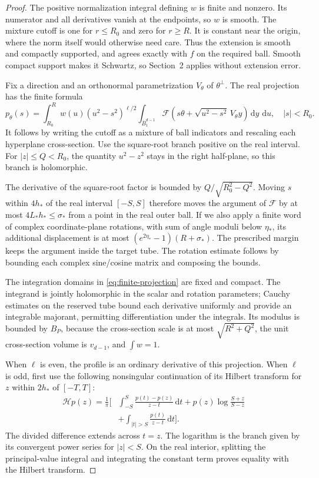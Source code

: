 \documentclass[11pt,letterpaper]{article}
\newcommand{\dd}{\,\mathrm d}
\newcommand{\HH}{\mathcal H}
\theoremstyle{definition}
\theoremstyle{remark}
\begin{document}
\begin{proof}
The positive normalization integral defining \(w\) is finite and nonzero.
Its numerator and all derivatives vanish at the endpoints, so \(w\) is smooth.
The mixture cutoff is one for \(r\le R_0\) and zero for \(r\ge R\).
It is constant near the origin, where the norm itself would otherwise need
care. Thus the extension is smooth and compactly supported, and agrees
exactly with \(f\) on the required ball. Smooth compact support makes it
Schwartz, so Section~2 applies without extension error.

Fix a direction and an orthonormal parametrization \(V_\theta\) of
\(\theta^\perp\). The real projection has the finite formula
\begin{equation}\label{eq:finite-projection}
 p_\theta(s)=\int_{R_0}^{R}w(u)(u^2-s^2)^{\ell/2}
       \int_{\overline B_1^{d-1}}
       \mathcal F\!\left(s\theta+\sqrt{u^2-s^2}\,V_\theta y\right)
                         \dd y\,\dd u,\quad |s|<R_0 .
\end{equation}
It follows by writing the cutoff as a mixture of ball indicators and rescaling
each hyperplane cross-section. Use the square-root branch positive on the
real interval. For \(|z|\le Q<R_0\), the quantity \(u^2-z^2\) stays in the
right half-plane, so this branch is holomorphic.

The derivative of the square-root factor is bounded by
\(Q/\sqrt{R_0^2-Q^2}\). Moving \(s\) within \(4h_*\) of the real interval
\([-S,S]\) therefore moves the argument of \(\mathcal F\) by at most
\(4L_*h_*\le\sigma_*\) from a point in the real outer ball.
If we also apply a finite word of complex coordinate-plane rotations, with
sum of angle moduli below \(\eta_*\), its additional displacement is at most
\((e^{2\eta_*}-1)(R+\sigma_*)\).
The prescribed margin keeps the argument inside the target tube.
The rotation estimate follows by bounding each complex sine/cosine matrix
and composing the bounds.

The integration domains in \eqref{eq:finite-projection} are fixed and compact.
The integrand is jointly holomorphic in the scalar and rotation parameters;
Cauchy estimates on the reserved tube bound each derivative uniformly and
provide an integrable majorant, permitting differentiation under the integrals.
Its modulus is bounded by \(B_P\), because the cross-section scale is at most
\(\sqrt{R^2+Q^2}\), the unit cross-section volume is \(v_{d-1}\), and
\(\int w=1\).

When \(\ell\) is even, the profile is an ordinary derivative of this projection.
When \(\ell\) is odd, first use the following nonsingular continuation of its
Hilbert transform for \(z\) within \(2h_*\) of \([-T,T]\):
\begin{align}
 \HH p(z)=\frac1\pi\bigg[
 &\int_{-S}^{S}\frac{p(t)-p(z)}{z-t}\dd t
 +p(z)\log\frac{S+z}{S-z}\nonumber\\
 &+\int_{|t|>S}\frac{p(t)}{z-t}\dd t\bigg].\label{eq:hilbert}
\end{align}
The divided difference extends across \(t=z\). The logarithm is the branch
given by its convergent power series for \(|z|<S\).
On the real interior, splitting the principal-value integral and integrating
the constant term proves equality with the Hilbert transform.


\end{proof}
\end{document}
